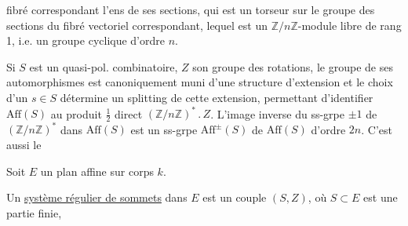 fibré correspondant l'ens de ses sections, qui est un torseur sur le groupe  des sections du fibré vectoriel correspondant, lequel est un $\mathbb Z/n\mathbb Z$-module libre de rang 1, i.e. un groupe cyclique d'ordre $n$.

Si $S$ est un quasi-pol. combinatoire, $Z$ son groupe des rotations, le groupe de ses automorphismes  est canoniquement muni d'une structure d'extension
et le choix d'un $s\in S$ détermine un splitting de cette extension, permettant d'identifier $\mathrm{Aff}(S)$ au produit $\frac12$ direct $(\mathbb Z/n\mathbb Z)^*\mathbin{.}Z$. L'image inverse du ss-grpe $\pm1$ de $(\mathbb Z/n\mathbb Z)^*$ dans $\mathrm{Aff}(S)$ est un ss-grpe $\mathrm{Aff}^{\pm}(S)$ de $\mathrm{Aff}(S)$ d'ordre $2n$. C'est aussi le

Soit $E$ un plan affine sur corps $k$.

Un \uline{système régulier de sommets} dans $E$ est  un couple $(S,Z)$, où $S\subset E$ est une partie finie,
